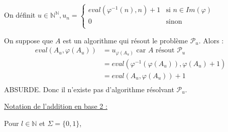\documentclass{scrartcl}
\begin{document}
			On définit $u \in \mathbb{N}^{\mathbb{N}}, u_n = \left\{ 
			\begin{array}{ll} eval(\varphi^{-1}(n),n)+1 & \mbox{si } n \in Im(\varphi) \\
			0 & \mbox{sinon} \\
			\end{array} \right. $


			On suppose que $A$ est un algorithme qui résout le problème $\mathcal{P}_u$. Alors :
			\begin{align*}
				eval(A_u, \varphi(A_u)) &= u_{\varphi(A_u)} \mbox{	car } A \mbox{ résout } \mathcal{P}_u \\
				&= eval(\varphi^{-1} (\varphi(A_u)), \varphi(A_u)+1) \\
				&= eval(A_u, \varphi(A_u)) +1 \\
			\end{align*}
			ABSURDE. Donc il n'existe pas d'algorithme résolvant $\mathcal{P}_u$.

			\underline{Notation de l'addition en base 2 :}

			Pour $l \in \mathbb{N}$ et $\Sigma = \{0,1\}$,
				
\end{document}
